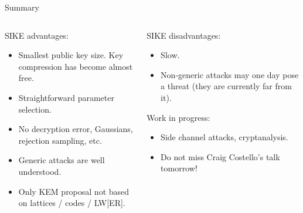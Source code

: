 \documentclass[aspectratio=169]{beamer}
\begin{document}
\begin{frame}{Summary}
  \begin{columns}[t]
    \begin{column}{0.45\textwidth}
      SIKE advantages:
      \begin{itemize}
      \item Smallest public key size. Key compression has become almost free.
      \item Straightforward parameter selection.
      \item No decryption error, Gaussians, rejection sampling, etc.
      \item Generic attacks are well understood.
      \item Only KEM proposal not based on lattices / codes / LW[ER].
      \end{itemize}
    \end{column}
    \begin{column}{0.45\textwidth}
      SIKE disadvantages:
      \begin{itemize}
      \item Slow.
      \item Non-generic attacks may one day pose a threat (they are currently far from it).
      \end{itemize}

      Work in progress:
      \begin{itemize}
      \item Side channel attacks, cryptanalysis.
      \item Do not miss Craig Costello's talk tomorrow!
      \end{itemize}
    \end{column}
  \end{columns}
\end{frame}
\end{document}
